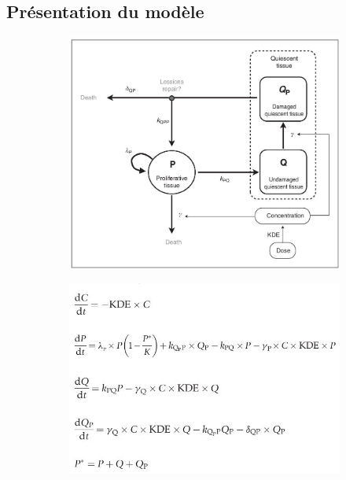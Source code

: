 \documentclass[12pt,a4paper]{article}
\begin{document}
\subsection{Présentation du modèle}
\begin{figure}
    \centering
    \begin{subfigure}[t]{0.45\textwidth}
        \centering
        \includegraphics[width=\linewidth]{Image/modele.JPG} 
        \caption{} \label{fig:model}
    \end{subfigure}
    \hfill
    \begin{subfigure}[t]{0.45\textwidth}
        \centering
        \includegraphics[width=\linewidth]{Image/eq.JPG} 
        \caption{} \label{fig:teq}
    \end{subfigure}


\end{figure}
\end{document}
